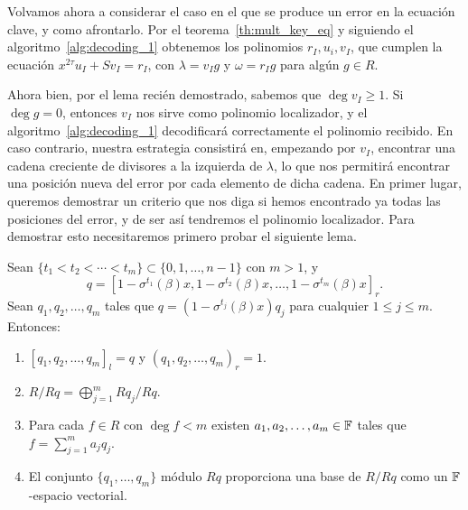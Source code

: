 Volvamos ahora a considerar el caso en el que se produce un error en la ecuación clave, y como afrontarlo. Por el teorema~\ref{th:mult_key_eq} y siguiendo el algoritmo~\ref{alg:decoding_1} obtenemos los polinomios \(r_I, u_i, v_I\), que cumplen la ecuación \(x^{2\tau}u_{I} + Sv_{I} = r_{I}\), con \(\lambda = v_I g\) y  \(\omega = r_I g\) para algún \(g \in R\).

Ahora bien, por el lema recién demostrado, sabemos que \(\deg v_I \ge 1\). Si \(\deg g = 0\), entonces \(v_I\) nos sirve como polinomio localizador, y el algoritmo~\ref{alg:decoding_1} decodificará correctamente el polinomio recibido. En caso contrario, nuestra estrategia consistirá en, empezando por \(v_I\), encontrar una cadena creciente de divisores a la izquierda de \(\lambda\), lo que nos permitirá encontrar una posición nueva del error por cada elemento de dicha cadena. En primer lugar, queremos demostrar un criterio que nos diga si hemos encontrado ya todas las posiciones del error, y de ser así tendremos el polinomio localizador. Para demostrar esto necesitaremos primero probar el siguiente lema.

\begin{lemma}
\label{lem:direct-sum}
    Sean \(\{t_1 < t_2 < \cdots < t_m \} \subset \{0, 1, \dots, n-1 \}\) con \(m > 1\), y
     \[
    q = {[1 - \sigma^{t_1}(\beta)x, 1 - \sigma^{t_2}(\beta)x, \ldots, 1 - \sigma^{t_m}(\beta)x]}_r
    .\]
    Sean \(q_1, q_2, \ldots, q_m\) tales que \(q = (1 - \sigma^{t_j}(\beta)x)q_j\) para cualquier \(1 \le j \le m\). Entonces:
\begin{enumerate}
    \item \({[q_1, q_2, \ldots, q_m]}_l = q\) y \({(q_1, q_2, \ldots, q_m)}_r = 1\).
    \item \(R/Rq = \bigoplus_{j = 1}^{m} Rq_j/Rq\).
    \item Para cada \(f \in R\) con \(\deg f < m\) existen  \(a_1, a_2, \ldots, a_m \in \mathbb{F}\) tales que \(f = \sum_{j=1}^{m}a_j q_j\).
    \item El conjunto \(\{q_1, \ldots, q_m\}\) módulo \(Rq\) proporciona una base de  \(R/Rq\) como un \(\mathbb{F}\)-espacio vectorial.
\end{enumerate}
\end{lemma}

